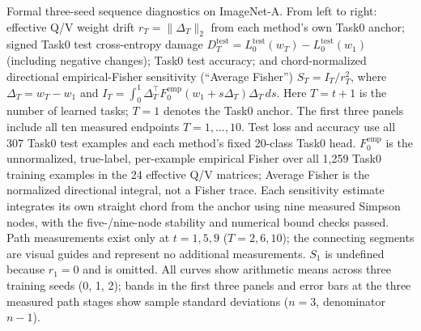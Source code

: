 \caption{Formal three-seed sequence diagnostics on ImageNet-A. From left to right: effective Q/V weight drift $r_T=\|\Delta_T\|_2$ from each method's own Task0 anchor; signed Task0 test cross-entropy damage $D_T^{\mathrm{test}}=L_0^{\mathrm{test}}(w_T)-L_0^{\mathrm{test}}(w_1)$ (including negative changes); Task0 test accuracy; and chord-normalized directional empirical-Fisher sensitivity (``Average Fisher'') $S_T=I_T/r_T^2$, where $\Delta_T=w_T-w_1$ and $I_T=\int_0^1\Delta_T^\top F_0^{\mathrm{emp}}(w_1+s\Delta_T)\Delta_T\,ds$. Here $T=t+1$ is the number of learned tasks; $T=1$ denotes the Task0 anchor. The first three panels include all ten measured endpoints $T=1,\ldots,10$. Test loss and accuracy use all 307 Task0 test examples and each method's fixed 20-class Task0 head. $F_0^{\mathrm{emp}}$ is the unnormalized, true-label, per-example empirical Fisher over all 1,259 Task0 training examples in the 24 effective Q/V matrices; Average Fisher is the normalized directional integral, not a Fisher trace. Each sensitivity estimate integrates its own straight chord from the anchor using nine measured Simpson nodes, with the five-/nine-node stability and numerical bound checks passed. Path measurements exist only at $t=1,5,9$ ($T=2,6,10$); the connecting segments are visual guides and represent no additional measurements. $S_1$ is undefined because $r_1=0$ and is omitted. All curves show arithmetic means across three training seeds (0, 1, 2); bands in the first three panels and error bars at the three measured path stages show sample standard deviations ($n=3$, denominator $n-1$).}
